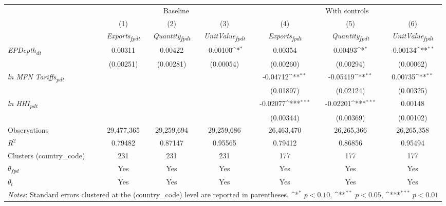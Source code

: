 {
\def\sym#1{\ifmmode^{#1}\else\(^{#1}\)\fi}
\begin{tabular}{l*{6}{c}}
\toprule
&\multicolumn{3}{c}{Baseline}&\multicolumn{3}{c}{With controls}\\\cmidrule(lr){2-4}\cmidrule(lr){5-7}
&(1)&(2)&(3)&(4)&(5)&(6)\\
&\textit{Exports\textsubscript{fpdt}}&\textit{Quantity\textsubscript{fpdt}}&\textit{UnitValue\textsubscript{fpdt}}&\textit{Exports\textsubscript{fpdt}}&\textit{Quantity\textsubscript{fpdt}}&\textit{UnitValue\textsubscript{fpdt}}\\
\midrule
\textit{EPDepth\textsubscript{dt}} & 0.00311 & 0.00422 & -0.00100\sym{*} & 0.00354 & 0.00493\sym{*} & -0.00134\sym{**}\\
 & (0.00251) & (0.00281) & (0.00054) & (0.00260) & (0.00294) & (0.00062)\\
\addlinespace
\textit{ln MFN Tariffs\textsubscript{pdt}} &  &  &  & -0.04712\sym{**} & -0.05419\sym{**} & 0.00735\sym{**}\\
 &  &  &  & (0.01897) & (0.02124) & (0.00325)\\
\addlinespace
\textit{ln HHI\textsubscript{pdt}} &  &  &  & -0.02077\sym{***} & -0.02201\sym{***} & 0.00148\\
 &  &  &  & (0.00344) & (0.00369) & (0.00102)\\
\midrule
Observations & 29,477,365 & 29,259,694 & 29,259,686 & 26,463,470 & 26,265,366 & 26,265,358\\
$R^{2}$ & 0.79482 & 0.87147 & 0.95565 & 0.79412 & 0.86856 & 0.95494\\
Clusters (country_code) & 231 & 231 & 231 & 177 & 177 & 177\\
$\theta_{fpd}$ & Yes & Yes & Yes & Yes & Yes & Yes\\
$\theta_{t}$ & Yes & Yes & Yes & Yes & Yes & Yes\\
\bottomrule
\multicolumn{7}{l}{\footnotesize \textit{Notes}: Standard errors clustered at the (country_code) level are reported in parentheses. \sym{*} \(p<0.10\), \sym{**} \(p<0.05\), \sym{***} \(p<0.01\)}\\
\end{tabular}
}
